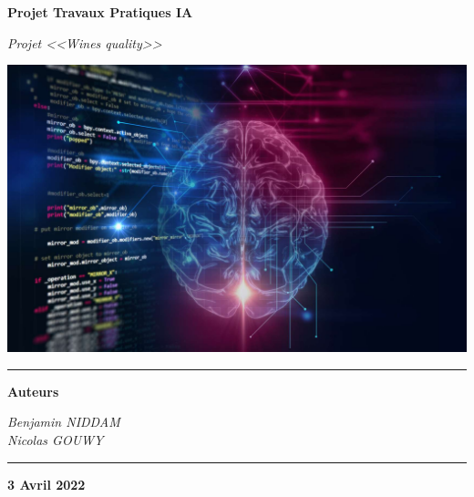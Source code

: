 \begin{titlepage}
    \begin{center}
        \vspace*{\fill}


        \textbf{\huge{Projet Travaux Pratiques IA}}

        \vspace{0.5cm}

        \textsl{\large{Projet <<Wines quality>>}}

        \vspace{1.5cm}

        \includegraphics[scale=0.2]{../intelligence-artificielle.jpg}

        \vspace{1.5cm}

        \rule{\linewidth}{0.15mm}
        \textbf{Auteurs}

        \vspace{0.5cm}

        \small{\textit{Benjamin NIDDAM}} \\
        \small{\textit{Nicolas GOUWY}} \\
        \rule{\linewidth}{0.15mm}

        \vspace{2.5cm}

        \vfill
        \textbf{3 Avril 2022}
    \end{center}
    \vspace*{\fill}
\end{titlepage}
